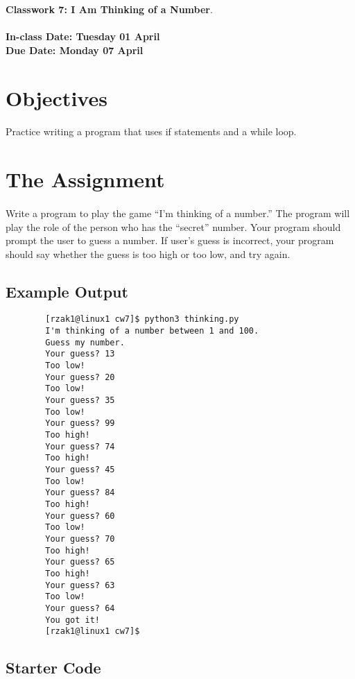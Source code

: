 \documentclass[letter,10pt]{article}
\begin{document}
    
    \huge
    \textbf{Classwork 7: I Am Thinking of a Number}.
    \normalsize
    \\ ~~ \\
    \textbf{In-class Date: Tuesday 01 April} \\
    \textbf{Due Date: Monday 07 April}
    
    \section*{Objectives}
    \paragraph{}Practice writing a program that uses if statements and a while loop.
    
    \section*{The Assignment}
    \paragraph{}Write a program to play the game ``I'm thinking of a number.'' The program will play the role of the person who has the ``secret'' number. Your program should prompt the user to guess a number. If user's guess is incorrect, your program should say whether the guess is too high or too low, and try again.
    
    \subsection*{Example Output}
    \begin{verbatim}
        [rzak1@linux1 cw7]$ python3 thinking.py
        I'm thinking of a number between 1 and 100.
        Guess my number.
        Your guess? 13
        Too low!
        Your guess? 20
        Too low!
        Your guess? 35
        Too low!
        Your guess? 99
        Too high!
        Your guess? 74
        Too high!
        Your guess? 45
        Too low!
        Your guess? 84
        Too high!
        Your guess? 60
        Too low!
        Your guess? 70
        Too high!
        Your guess? 65
        Too high!
        Your guess? 63
        Too low!
        Your guess? 64
        You got it!
        [rzak1@linux1 cw7]$ 
    \end{verbatim}
    
    \subsection*{Starter Code}
\end{document}
